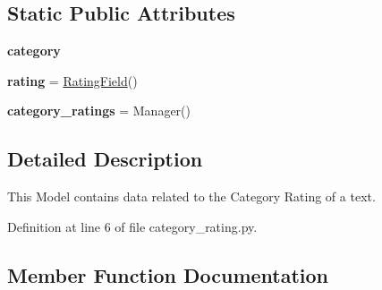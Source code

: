 \subsection*{Static Public Attributes}
\begin{DoxyCompactItemize}
\item 
{\bfseries category}
\item 
\mbox{\label{classcapstoneproject_1_1models_1_1models_1_1category__rating_1_1_category_rating_a658c8a259535dd529c1b9b5cb102e535}} 
{\bfseries rating} = \mbox{\hyperlink{classcapstoneproject_1_1models_1_1fields_1_1rating__field_1_1_rating_field}{Rating\+Field}}()
\item 
\mbox{\label{classcapstoneproject_1_1models_1_1models_1_1category__rating_1_1_category_rating_a2900b7806333a79a2bce732f4911c3e9}} 
{\bfseries category\+\_\+ratings} = Manager()
\end{DoxyCompactItemize}


\subsection{Detailed Description}
\begin{DoxyVerb}This Model contains data related to the Category Rating
of a text.
\end{DoxyVerb}
 

Definition at line 6 of file category\+\_\+rating.\+py.



\subsection{Member Function Documentation}
\mbox{\label{classcapstoneproject_1_1models_1_1models_1_1category__rating_1_1_category_rating_ab343d7f84b5da012d78ae10091aad8d9}} 
